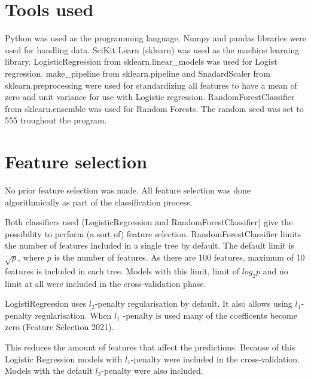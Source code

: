 \documentclass[a4size, 12pt]{report}
\begin{document}
	
		\section*{Tools used}
	
	Python was used as the programming language. Numpy and pandas libraries were used for handling data. SciKit Learn (sklearn) was used as the machine learning library. 
	LogisticRegression from sklearn.linear\_models was used for Logist regression. make\_pipeline from sklearn.pipeline and SnadardScaler from sklearn.preprocessing were used for standardizing all features to have a mean of zero and unit variance for use with Logistic regression. RandomForestClassifier from sklearn.ensemble was used for Random Forests. The random seed was set to 555 troughout the program. 
	
	\section*{Feature selection}
	
   No prior feature selection was made. All feature selection was done algorithmically as part of the classification process. 	
	
	Both classifiers used (LogisticRegression and RandomForestClassifier) give the possibility to perform (a sort of) feature selection. RandomForestClassifier limits the number of features included in a single tree by default. The default limit is $\sqrt{p}$, where $p$ is the number of features. As there are 100 features, maximum of 10 features is included in each tree. Models with this limit, limit of $log_2 p$ and no limit at all were included in the cross-validation phase. 
	
	 LogistiRegression uses $l_2$-penalty regularisation by default. It also allows using $l_1$-penalty regularisation.
		When $l_1$ -penalty is used many of the coefficents become zero (Feature Selection 2021).
		
		 This reduces the amount of features that affect the predictions. Because of this Logistic Regression models with $l_1$-penalty were included in the cross-validation. Models with the default $l_2$-penalty were also included.
	
		
	
	
	
\end{document}
